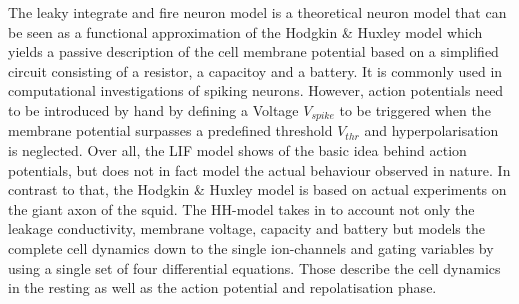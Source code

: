 \documentclass{scrartcl}			%
\begin{document}
\begin{enumerate}
The  leaky integrate and fire neuron model is a theoretical neuron model that can be seen as a functional approximation of the Hodgkin & Huxley model which yields a passive description of the cell membrane potential based on a simplified circuit consisting of a resistor, a capacitoy and a battery. It is commonly used in computational investigations of spiking neurons. However, action potentials need to be introduced by hand by defining a Voltage $V_{spike}$ to be triggered when the membrane potential surpasses a predefined threshold $V_{thr}$ and hyperpolarisation is neglected. Over all, the LIF model shows of the basic idea behind action potentials, but does not in fact model the actual behaviour observed in nature.  
\newline
In contrast to that, the Hodgkin \& Huxley model is based on actual experiments on the giant axon of the squid.
The HH-model takes in to account not only the leakage conductivity, membrane voltage, capacity and battery but models the complete cell dynamics down to the single ion-channels and gating variables by using a single set of four differential equations. Those describe the cell dynamics in the resting as well as the action potential and repolatisation phase. 
\end{enumerate}
\end{document}
